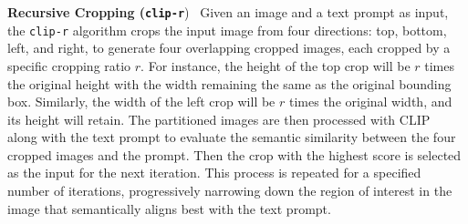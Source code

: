 
\textbf{Recursive Cropping (\texttt{clip-r}})~
Given an image and a text prompt as input, the \texttt{clip-r} algorithm crops the input image from four directions: top, bottom, left, and right, to generate four overlapping cropped images, each cropped by a specific cropping ratio $r$. 
For instance, the height of the top crop will be $r$ times the original height with the width remaining the same as the original bounding box. 
Similarly, the width of the left crop will be $r$ times the original width, and its height will retain. 
The partitioned images are then processed with CLIP~\citep{clip} along with the text prompt to evaluate the semantic similarity between the four cropped images and the prompt. Then the crop with the highest score is selected as the input for the next iteration. This process is repeated for a specified number of iterations, progressively narrowing down the region of interest in the image that semantically aligns best with the text prompt.


